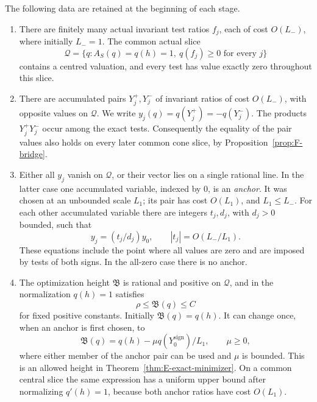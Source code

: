 The following data are retained at the beginning of each stage.
\begin{enumerate}[label=\textup{(I\arabic*)}]
\item\label{it:G-tests}
There are finitely many actual invariant test ratios $f_j$, each of cost
$O(L_-)$, where initially $L_-=1$.  The common actual slice
\begin{equation}\label{eq:G-slice}
 \mathcal Q=\{q:A_S(q)=q(h)=1,\ q(f_j)\ge0\text{ for every }j\}
\end{equation}
contains a centred valuation, and every test has value exactly zero
throughout this slice.

\item\label{it:G-pairs}
There are accumulated pairs $Y_j^+,Y_j^-$ of invariant ratios of cost
$O(L_-)$, with opposite values on $\mathcal Q$.  We write
$y_j(q)=q(Y_j^+)=-q(Y_j^-)$.  The products $Y_j^+Y_j^-$ occur among the
exact tests.  Consequently the equality of the pair values also holds
on every later common cone slice, by Proposition~\ref{prop:F-bridge}.

\item\label{it:G-anchor}
Either all $y_j$ vanish on $\mathcal Q$, or their vector lies on a single
rational line.  In the latter case one accumulated variable, indexed by
$0$, is an \emph{anchor}.  It was chosen at an unbounded scale $L_1$;
its pair has cost $O(L_1)$, and $L_1\le L_-$.  For each other accumulated
variable there are integers $t_j,d_j$, with $d_j>0$ bounded, such that
\begin{equation}\label{eq:G-proportions}
 y_j=(t_j/d_j)y_0,
 \qquad |t_j|=O(L_-/L_1).
\end{equation}
These equations include the point where all values are zero and are
imposed by tests of both signs.  In the all-zero case there is no anchor.

\item\label{it:G-baseline}
The optimization height $\mathfrak B$ is rational and positive on
$\mathcal Q$, and in the normalization $q(h)=1$ satisfies
\begin{equation}\label{eq:G-baseline-bounds}
                  \rho\le\mathfrak B(q)\le C
\end{equation}
for fixed positive constants.  Initially $\mathfrak B(q)=q(h)$.
It can change once, when an anchor is first chosen, to
\begin{equation}\label{eq:G-baseline}
 \mathfrak B(q)=q(h)-\mu q(Y_0^{\mathrm{sign}})/L_1,
 \qquad \mu\ge0,
\end{equation}
where either member of the anchor pair can be used and $\mu$ is bounded.
This is an allowed height in Theorem~\ref{thm:E-exact-minimizer}.  On a common
central slice the same expression has a uniform upper bound after
normalizing $q'(h)=1$, because both anchor ratios have cost $O(L_1)$.


\end{enumerate}
